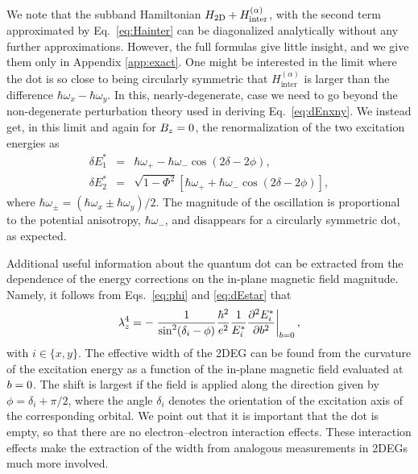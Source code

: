 \documentclass[aps,floatfix,twocolumn,showpacs,10pt,nofootinbib]{revtex4-1}
\newcommand{\be}{\begin{equation}}
\newcommand{\ee}{\end{equation}}
\begin{document}
We note that the subband Hamiltonian $H_{\rm 2D}+H^{(\alpha)}_\textrm{inter}$, with the second term approximated by Eq.~\eqref{eq:Hainter} can be diagonalized analytically without any further approximations. However, the full formulas give little insight, and we give them only in Appendix \ref{app:exact}. One might be interested in the limit where the dot is so close to being circularly symmetric that  $H_{\textrm{inter}}^{(\alpha)}$ is larger than the difference $\hbar \omega_x-\hbar \omega_y$. In this, nearly-degenerate, case we need to go beyond the non-degenerate perturbation theory used in deriving Eq.~\eqref{eq:dEnxny}. We instead get, in this limit and again for $B_z=0$, the renormalization of the two excitation energies as
\begin{subequations}
\label{eq:dEstar2}
\begin{eqnarray}
\delta E^*_1 &=& \hbar \omega_+ - \hbar \omega_- \cos(2\delta-2\phi) ,\\
\delta E^*_2 &=& \sqrt{1-\Phi^2} \left[ \hbar \omega_+ + \hbar \omega_- \cos(2\delta-2\phi) \right],
\end{eqnarray}
\end{subequations}
where $\hbar \omega_\pm = (\hbar \omega_x \pm \hbar \omega_y)/2$. The magnitude of the oscillation is proportional to the potential anisotropy, $\hbar \omega_-$, and disappears for a circularly symmetric dot, as expected.



Additional useful information about the quantum dot can be extracted from the  dependence of the energy corrections on the in-plane magnetic field magnitude. Namely, it follows from Eqs.~\eqref{eq:phi} and \eqref{eq:dEstar} that
\be
\lambda_z^4 = -\left. \frac{1}{\sin^2(\delta_i-\phi)} \frac{\hbar^2}{e^2}\frac{1}{E^*_i} \frac{\partial^2 E^*_i}{\partial \Binscalar ^2}\right|_{\Binscalar =0},
\ee
with $i \in \{x,y\}$. The effective width of the 2DEG can be found from the curvature of the excitation energy as a function of the in-plane magnetic field evaluated at $b =0$. The shift is largest if the field is applied along the direction given by $\phi=\delta_i+\pi/2$, where the angle $\delta_i$ denotes the orientation of the excitation axis of the corresponding orbital. We point out that it is important that the dot is empty, so that there are no electron--electron interaction effects. These interaction effects make the extraction of the width from analogous measurements in 2DEGs much more involved.\cite{kunze1987:PRB, smrcka1995:PRB, salis1998:PRB, tutuc2003:PRB, gokmen2008:PRB}
\end{document}
